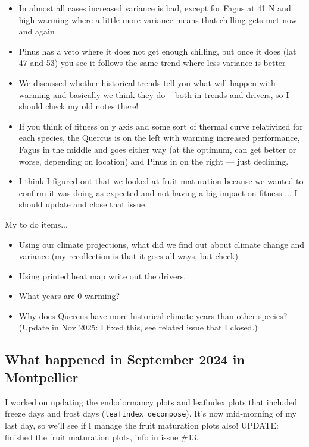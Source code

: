\documentclass[11pt,letter]{article}
\begin{document}
\begin{itemize}
\item In almost all cases increased variance is bad, except for Fagus at 41 N and high warming where a little more variance means that chilling gets met now and again
\item Pinus has a veto where it does not get enough chilling, but once it does (lat 47 and 53) you see it follows the same trend where less variance is better
\item We discussed whether historical trends tell you what will happen with warming and basically we think they do -- both in trends and drivers, so I should check my old notes there!
\item If you think of fitness on y axis and some sort of thermal curve relativized for each species, the Quercus is on the left with warming increased performance, Fagus in the middle and goes either way (at the optimum, can get better or worse, depending on location) and Pinus in on the right --- just declining. 
\item I think I figured out that we looked at fruit maturation because we wanted to confirm it was doing as expected and not having a big impact on fitness ... I should update and close that issue. 
\end{itemize}

My to do items...
\begin{itemize}
\item Using our climate projections, what did we find out about climate change and variance (my recollection is that it goes all ways, but check)
\item Using printed heat map write out the drivers. 
\item What years are 0 warming?
\item Why does Quercus have more historical climate years than other species? (Update in Nov 2025: I fixed this, see related issue that I closed.)
\end{itemize}

\subsection{What happened in September 2024 in Montpellier}

I worked on updating the endodormancy plots and leafindex plots that included freeze days and frost days (\verb|leafindex_decompose|). It's now mid-morning of my last day, so we'll see if I manage the fruit maturation plots also! UPDATE: finished the fruit maturation plots, info in issue \#13. 
\end{document}
